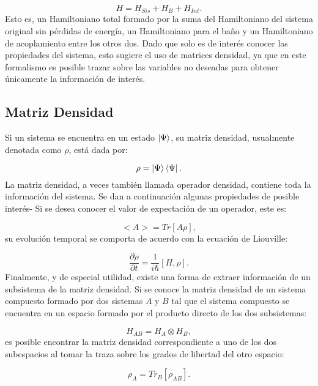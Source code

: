 \documentclass[a4paper,10pt]{report}
\begin{document}
\begin{equation} \label{BathSysH}
H = H_{Sis} + H_{B} + H_{Int}.
\end{equation} Esto es, un Hamiltoniano total formado por la suma del Hamiltoniano del sistema original sin pérdidas de energía, un Hamiltoniano para el baño y un Hamiltoniano de acoplamiento entre los otros dos.  Dado que solo es de interés conocer las propiedades del sistema, esto sugiere el uso de matrices densidad, ya que en este formalismo es posible trazar sobre las variables no deseadas para obtener únicamente la información de interés.

\subsection{Matriz Densidad}

Si un sistema se encuentra en un estado $\Ket{\Psi}$, su matriz densidad\cite{BlumDM}, usualmente denotada como $\rho$, está dada por:

\begin{equation}
\rho = \Ket{\Psi}\Bra{\Psi}.
\end{equation} La matriz densidad, a veces también llamada operador densidad, contiene toda la información del sistema. Se dan a continuación algunas propiedades de posible interés- Si se desea conocer el valor de expectación de un operador, este es:

\begin{equation}
<A> = Tr[A\rho],
\end{equation} su evolución temporal se comporta de acuerdo con la ecuación de Liouville:

\begin{equation}
\dfrac{\partial \rho}{\partial t} = \frac{1}{i\hbar}[H,\rho].
\end{equation} Finalmente, y de especial utilidad, existe una forma de extraer información de un subsistema de la matriz densidad. Si se conoce la matriz densidad de un sistema compuesto formado por dos sistemas $A$ y $B$ tal que el sistema compuesto se encuentra en un espacio formado por el producto directo de los dos subsistemas:

\begin{equation}
H_{AB} = H_A \otimes H_B,
\end{equation} es posible encontrar la matriz densidad correspondiente a uno de los dos subespacios al tomar la traza sobre los grados de libertad del otro espacio:

\begin{equation}
\rho_A = Tr_B [\rho_{AB}].
\end{equation}
\end{document}
